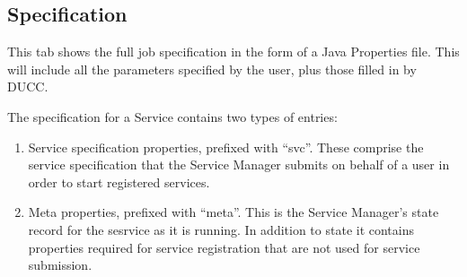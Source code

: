    \subsection{Specification}
   \label{sec:ws-managed-reservation-specification}
   This tab shows the full job specification in the form of a Java Properties
   file.  This will include all the parameters specified by the user, plus those
   filled in by DUCC.
        
   The specification for a Service contains two types of entries:
   \begin{enumerate}
     \item Service specification properties, prefixed with ``svc''. These comprise
       the service specification that the Service Manager submits on behalf of
       a user in order to start registered services.
     \item Meta properties, prefixed with ``meta''.  This is the Service Manager's state
       record for the sesrvice as it is running.  In addition to state it contains
       properties required for service registration that are not used for
       service submission.
   \end{enumerate}
   
